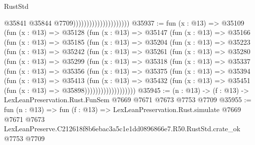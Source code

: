 \begin{lexlean}{RustStd}
\begin{coremodule}
                                              @35841
                                              @35844
                                              @7709)))))))))))))))))))))
@35937 := fun (x : @13) =>
  @35109
    (fun (x : @13) =>
    @35128
      (fun (x : @13) =>
      @35147
        (fun (x : @13) =>
        @35166
          (fun (x : @13) =>
          @35185
            (fun (x : @13) =>
            @35204
              (fun (x : @13) =>
              @35223
                (fun (x : @13) =>
                @35242
                  (fun (x : @13) =>
                  @35261
                    (fun (x : @13) =>
                    @35280
                      (fun (x : @13) =>
                      @35299
                        (fun (x : @13) =>
                        @35318
                          (fun (x : @13) =>
                          @35337
                            (fun (x : @13) =>
                            @35356
                              (fun (x : @13) =>
                              @35375
                                (fun (x : @13) =>
                                @35394
                                  (fun (x : @13) =>
                                  @35413
                                    (fun (x : @13) =>
                                    @35432
                                      (fun (x : @13) =>
                                      @35451 (fun (x : @13) => @35898)))))))))))))))))))
@35945 := (n : @13) -> (f : @13) -> LexLeanPreservation.Rust.FunSem @7669 @7671 @7673 @7753 @7709
@35955 := fun (n : @13) =>
  fun (f : @13) =>
  LexLeanPreservation.Rust.simulate
    @7669
    @7671
    @7673
    LexLeanPreserve.C212618f8b6ebac3a5c1e1dd0896866e7.R50.RustStd.crate_ok
    @7753
    @7709
\end{coremodule}
\end{lexlean}
